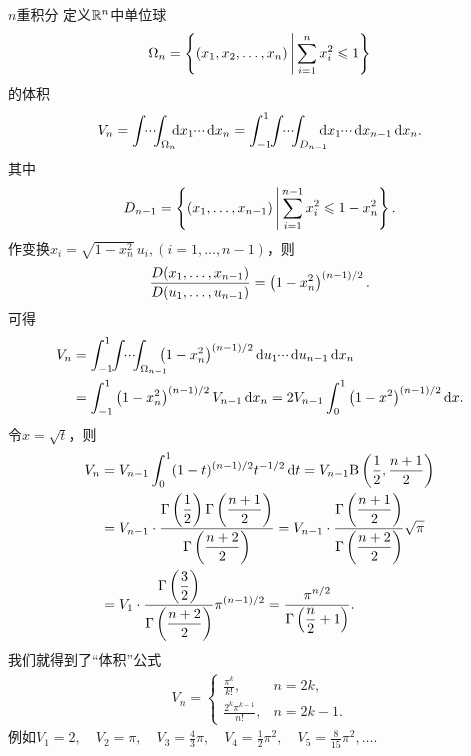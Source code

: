 \begin{example}{$n$重积分}{}
	定义$\mathbb R^n$中单位球
	\[
		\Omega_n=\left\{(x_1,x_2,\ldots,x_n)\,\middle\vert\,\sum_{i=1}^nx_i^2\leqslant 1\right\}
	\]
	的体积
	\[
		V_n=\int\bs3\cdot\bs2\cdot\bs2\cdot\bs4\int_{\Omega_n}\bs5\d x_1\bs3\cdot\bs2\cdot\bs2\cdot\bs1\d x_n=\int_{-1}^1\bs3\int\bs3\cdot\bs2\cdot\bs2\cdot\bs4\int_{D_{n-1}}\bs8\d x_1\bs3\cdot\bs2\cdot\bs2\cdot\bs1\d x_{n-1}\d x_n.
	\]
	其中
	\[
		D_{n-1}=\left\{(x_1,\ldots,x_{n-1})\,\middle\vert\,\sum_{i=1}^{n-1}x_i^2\leqslant 1-x_n^2\right\}.
	\]
	作变换$x_i=\sqrt{1-x_n^2}\,u_i,(i=1,\ldots,n-1)$，则
	\[
		\frac{D(x_1,\ldots,x_{n-1})}{D(u_1,\ldots,u_{n-1})}=\left(1-x_n^2\right)^{\left(n-1\right)/2}.
	\]
	可得
	\begin{align*}
		V_n & =\int_{-1}^1\bs3\int\bs3\cdot\bs2\cdot\bs2\cdot\bs4\int_{\Omega_{n-1}}\bs8\left(1-x_n^2\right)^{\kh{n-1}/2}\d u_1\bs3\cdot\bs2\cdot\bs2\cdot\bs1\d u_{n-1}\d x_n \\
			& =\int_{-1}^1\left(1-x_n^2\right)^{\kh{n-1}/2}V_{n-1}\d x_n=2V_{n-1}\int_0^1\left(1-x^2\right)^{\kh{n-1}/2}\d x.
	\end{align*}
	令$x=\sqrt t$，则
	\begin{align*}
		V_n & =V_{n-1}\int_0^1(1-t)^{\left(n-1\right)/2}t^{-1/2}\mathop{}\!\mathrm{d} t=V_{n-1}\text B\left(\frac12,\frac{n+1}2\right)                                                                  \\
			& =V_{n-1}\cdot\frac{\displaystyle \Gamma\left(\frac12\right)\Gamma\left(\frac{n+1}2\right)}{\displaystyle \Gamma\left(\frac{n+2}2\right)}=V_{n-1}\cdot\frac{\displaystyle \Gamma\left(\frac{n+1}2\right)}{\displaystyle \Gamma\left(\frac{n+2}2\right)}\sqrt\pi \\
			& =V_1\cdot\frac{\displaystyle \Gamma\left(\frac32\right)}{\displaystyle \Gamma\left(\frac{n+2}2\right)}\pi^{\left(n-1\right)/2}=\frac{\displaystyle \pi^{n/2}}{\displaystyle \Gamma\left(\frac n2+1\right)}.
	\end{align*}
	我们就得到了“体积”公式
	\begin{align}
		V_n=
		\begin{cases}
			\frac{\pi^k}{k!},        & n=2k,   \\[
		2ex]
			\frac{2^k\pi^{k-1}}{n!}, & n=2k-1.
		\end{cases}
	\end{align}
	例如$V_1=2,\quad V_2=\pi,\quad V_3=\frac 43\pi,\quad V_4=\frac 12\pi^2,\quad V_5=\frac 8{15}\pi^2,\ldots.$
\end{example}
\clearpage
